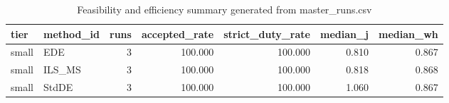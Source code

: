 \begin{table}[!t]
\centering
\caption{Feasibility and efficiency summary generated from master_runs.csv}
\label{tab:feasibility_summary_generated}
\begin{tabular}{llrrrrr}
\toprule
tier & method_id & runs & accepted_rate & strict_duty_rate & median_j & median_wh \\
\midrule
small & EDE & 3 & 100.000 & 100.000 & 0.810 & 0.867 \\
small & ILS_MS & 3 & 100.000 & 100.000 & 0.818 & 0.868 \\
small & StdDE & 3 & 100.000 & 100.000 & 1.060 & 0.867 \\
\bottomrule
\end{tabular}

\end{table}